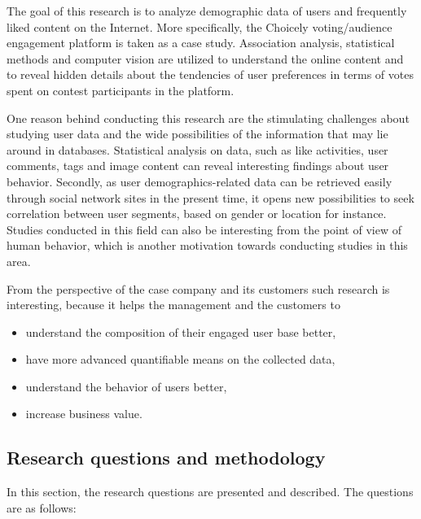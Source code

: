     The goal of this research is to analyze demographic data of users and frequently liked content on the Internet. More specifically, the Choicely voting/audience engagement platform is taken as a case study. Association analysis, statistical methods and computer vision are utilized to understand the online content and to reveal hidden details about the tendencies of user preferences in terms of votes spent on contest participants in the platform.
    
    One reason behind conducting this research are the stimulating challenges about studying user data and the wide possibilities of the information that may lie around in databases. Statistical analysis on data, such as like activities, user comments, tags and image content can reveal interesting findings about user behavior. Secondly, as user demographics-related data can be retrieved easily through social network sites in the present time, it opens new possibilities to seek correlation between user segments, based on gender or location for instance. Studies conducted in this field can also be interesting from the point of view of human behavior, which is another motivation towards conducting studies in this area. 

    From the perspective of the case company and its customers such research is interesting, because it helps the management and the customers to 

    \begin{itemize}
        \item understand the composition of their engaged user base better,
        \item have more advanced quantifiable means on the collected data,
        \item understand the behavior of users better, 
        \item increase business value.
    \end{itemize} 

\subsection{Research questions and methodology}
    In this section, the research questions are presented and described. The questions are as follows:

